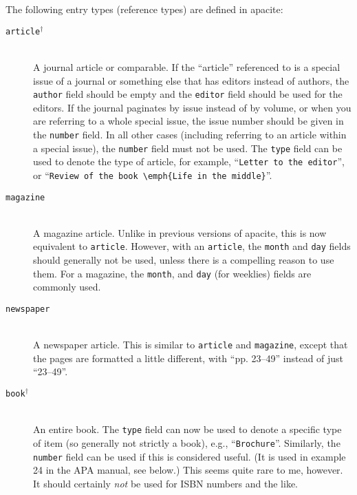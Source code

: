 \documentclass{article}
\newcommand{\LC}{\mbox{${}^{\dag}$}}%
\newcommand{\pkg}[1]{\textsf{#1}}%
\newcommand{\fieldname}[1]{\texttt{#1}}%
\newcommand{\entryname}[1]{\texttt{#1}}%
\begin{document}
The following entry types (reference types) are defined in \pkg{apacite}:
\begin{description}
    \item[\entryname{article}\LC] \mbox{}\\
        A journal article or comparable. If the
        ``article'' referenced to is a special issue of a journal or
        something else that has editors instead of authors, the
        \fieldname{author} field should be empty and the \fieldname{editor}
        field should be used for the editors. If the journal paginates
        by issue instead of by volume, or when you are referring to a
        whole special issue, the issue number should be given
        in the \fieldname{number} field. In all other cases (including
        referring to an article within a special issue), the
        \fieldname{number} field must not be used. The \fieldname{type}
        field can be used to denote the type of article, for example,
        ``\verb+Letter to the editor+'', or
        ``\verb+Review of the book \emph{Life in the middle}+''.

    \item[\entryname{magazine}] \mbox{}\\
        A magazine article. Unlike in previous versions of \pkg{apacite},
        this is now equivalent to \entryname{article}. However, with
        an \entryname{article}, the \fieldname{month} and \fieldname{day}
        fields should generally not be used, unless there is a compelling
        reason to use them. For a magazine, the \fieldname{month}, and
        \fieldname{day} (for weeklies) fields are commonly used.

    \item[\entryname{newspaper}] \mbox{}\\
        A newspaper article. This is similar to \entryname{article} and
        \fieldname{magazine}, except that the pages are formatted a little
        different, with ``pp. 23--49'' instead of just ``23--49''.

    \item[\entryname{book}\LC] \mbox{}\\
        An entire book. The \fieldname{type} field can now be used
        to denote a specific type of item (so generally not strictly
        a book), e.g., ``\verb+Brochure+''. Similarly, the
        \fieldname{number} field can be used if this is considered
        useful. (It is used in example 24 in the APA manual, see
        below.) This seems quite rare to me, however. It should
        certainly \emph{not} be used for ISBN numbers and the like.


\end{description}
\end{document}
